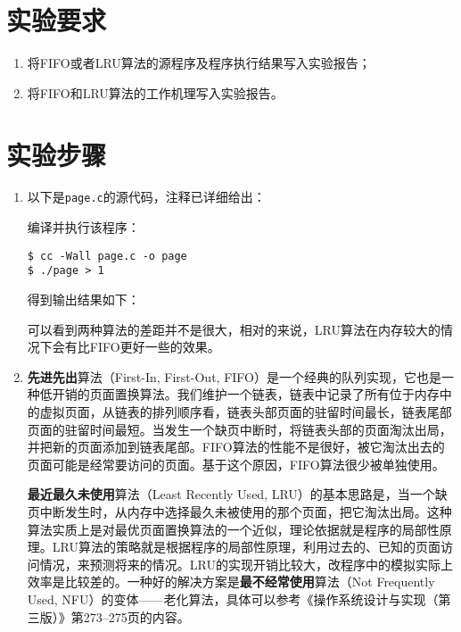 \documentclass[c5size,a4paper,nofonts]{ctexart}
\begin{document}
\section{实验要求}
\begin{enumerate}[label={(\arabic*)}]
\item 将FIFO或者LRU算法的源程序及程序执行结果写入实验报告；
\item 将FIFO和LRU算法的工作机理写入实验报告。
\end{enumerate}

\fi

\section{实验步骤}

\begin{enumerate}

\item 以下是{\tt page.c}的源代码，注释已详细给出：

{\small\linespread{1}}

编译并执行该程序：

\begin{Verbatim}[frame=single]
$ cc -Wall page.c -o page
$ ./page > 1
\end{Verbatim}

得到输出结果如下：


可以看到两种算法的差距并不是很大，相对的来说，LRU算法在内存较大的情况下会有比FIFO更好一些的效果。

\item {\bf 先进先出}算法（First-In, First-Out, FIFO）是一个经典的队列实现，它也是一种低开销的页面置换算法。我们维护一个链表，链表中记录了所有位于内存中的虚拟页面，从链表的排列顺序看，链表头部页面的驻留时间最长，链表尾部页面的驻留时间最短。当发生一个缺页中断时，将链表头部的页面淘汰出局，并把新的页面添加到链表尾部。FIFO算法的性能不是很好，被它淘汰出去的页面可能是经常要访问的页面。基于这个原因，FIFO算法很少被单独使用。

{\bf 最近最久未使用}算法（Least Recently Used, LRU）的基本思路是，当一个缺页中断发生时，从内存中选择最久未被使用的那个页面，把它淘汰出局。这种算法实质上是对最优页面置换算法的一个近似，理论依据就是程序的局部性原理。LRU算法的策略就是根据程序的局部性原理，利用过去的、已知的页面访问情况，来预测将来的情况。LRU的实现开销比较大，改程序中的模拟实际上效率是比较差的。一种好的解决方案是{\bf 最不经常使用}算法（Not Frequently Used, NFU）的变体——老化算法，具体可以参考《操作系统设计与实现（第三版）》第273--275页的内容。

\end{enumerate}
\end{document}
